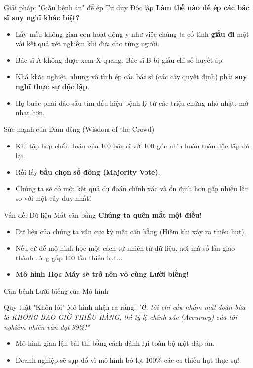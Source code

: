 \documentclass[aspectratio=169]{beamer}
\begin{document}
\begin{frame}{Giải pháp: "Giấu bệnh án" để ép Tư duy Độc lập}
    \textbf{Làm thế nào để ép các bác sĩ suy nghĩ khác biệt?}
    \begin{itemize}
        \item Lấy mẫu không gian con hoạt động y như việc chúng ta cố tình \textbf{giấu đi} một vài kết quả xét nghiệm khi đưa cho từng người.
        \item Bác sĩ A không được xem X-quang. Bác sĩ B bị giấu chỉ số huyết áp.
        \item Khá khắc nghiệt, nhưng vô tình ép các bác sĩ (các cây quyết định) phải \textbf{suy nghĩ thực sự độc lập}.
        \item Họ buộc phải đào sâu tìm dấu hiệu bệnh lý từ các triệu chứng nhỏ nhặt, mờ nhạt hơn.
    \end{itemize}
\end{frame}

\begin{frame}{Sức mạnh của Đám đông (Wisdom of the Crowd)}
    \begin{itemize}
        \item Khi tập hợp chẩn đoán của 100 bác sĩ với 100 góc nhìn hoàn toàn độc lập đó lại.
        \item Rồi lấy \textbf{bầu chọn số đông (Majority Vote)}.
        \item Chúng ta sẽ có một kết quả dự đoán chính xác và ổn định hơn gấp nhiều lần so với một cây duy nhất!
    \end{itemize}
\end{frame}

\begin{frame}{Vấn đề: Dữ liệu Mất cân bằng}
    \textbf{Chúng ta quên mất một điều!}
    \begin{itemize}
        \item Dữ liệu của chúng ta vẫn cực kỳ mất cân bằng (Hiếm khi xảy ra thiếu hụt).
        \item Nếu cứ để mô hình học một cách tự nhiên từ dữ liệu, nơi mà số lần giao thành công gấp 100 lần thiếu hụt...
        \item \textbf{Mô hình Học Máy sẽ trở nên vô cùng Lười biếng!}
    \end{itemize}
\end{frame}

\begin{frame}{Căn bệnh Lười biếng của Mô hình}
    \begin{block}{Quy luật "Khôn lỏi"}
        Mô hình nhận ra rằng: \textit{"Ồ, tôi chỉ cần nhắm mắt đoán bừa là KHÔNG BAO GIỜ THIẾU HÀNG, thì tỷ lệ chính xác (Accuracy) của tôi nghiễm nhiên vẫn đạt 99\%!"}
    \end{block}
    \begin{itemize}
        \item Mô hình gian lận bài thi bằng cách đánh lụi toàn bộ một đáp án.
        \item Doanh nghiệp sẽ sụp đổ vì mô hình bỏ lọt 100\% các ca thiếu hụt thực sự!
    \end{itemize}
\end{frame}
\end{document}
